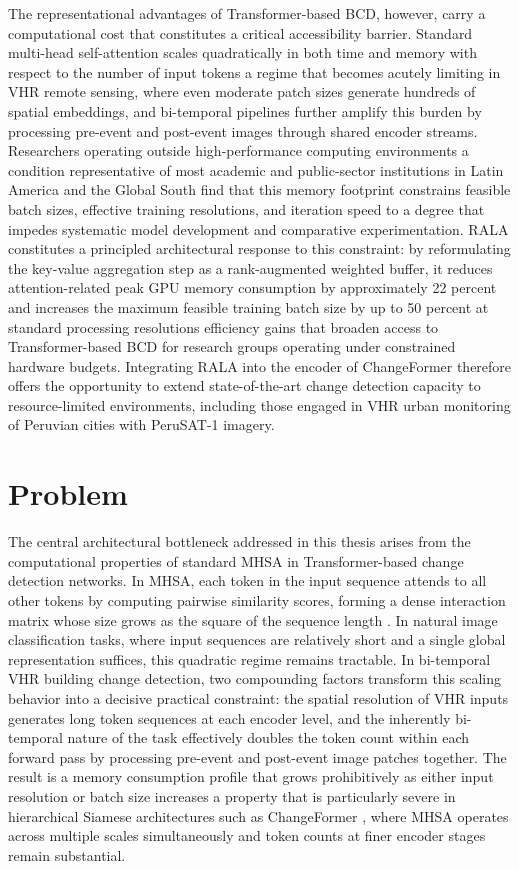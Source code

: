 The representational advantages of Transformer-based \ac{BCD}, however, carry a computational cost that constitutes a critical accessibility barrier. Standard multi-head self-attention scales quadratically in both time and memory with respect to the number of input tokens a regime that becomes acutely limiting in \ac{VHR} remote sensing, where even moderate patch sizes generate hundreds of spatial embeddings, and bi-temporal pipelines further amplify this burden by processing pre-event and post-event images through shared encoder streams. Researchers operating outside high-performance computing environments a condition representative of most academic and public-sector institutions in Latin America and the Global South find that this memory footprint constrains feasible batch sizes, effective training resolutions, and iteration speed to a degree that impedes systematic model development and comparative experimentation. \ac{RALA} \cite{Fan2025RALA} constitutes a principled architectural response to this constraint: by reformulating the key-value aggregation step as a rank-augmented weighted buffer, it reduces attention-related peak \ac{GPU} memory consumption by approximately 22 percent and increases the maximum feasible training batch size by up to 50 percent at standard processing resolutions  efficiency gains that broaden access to Transformer-based \ac{BCD} for research groups operating under constrained hardware budgets. Integrating \ac{RALA} into the encoder of ChangeFormer therefore offers the opportunity to extend state-of-the-art change detection capacity to resource-limited environments, including those engaged in \ac{VHR} urban monitoring of Peruvian cities with PeruSAT-1 imagery.


\section{Problem}

The central architectural bottleneck addressed in this thesis arises from the computational properties of standard \ac{MHSA} in Transformer-based change detection networks. In \ac{MHSA}, each token in the input sequence attends to all other tokens by computing pairwise similarity scores, forming a dense interaction matrix whose size grows as the square of the sequence length \cite{Vaswani2017Attention}. In natural image classification tasks, where input sequences are relatively short and a single global representation suffices, this quadratic regime remains tractable. In bi-temporal \ac{VHR} building change detection, two compounding factors transform this scaling behavior into a decisive practical constraint: the spatial resolution of \ac{VHR} inputs generates long token sequences at each encoder level, and the inherently bi-temporal nature of the task effectively doubles the token count within each forward pass by processing pre-event and post-event image patches together. The result is a memory consumption profile that grows prohibitively as either input resolution or batch size increases a property that is particularly severe in hierarchical Siamese architectures such as ChangeFormer \cite{Bandara2022ChangeFormer}, where \ac{MHSA} operates across multiple scales simultaneously and token counts at finer encoder stages remain substantial.

